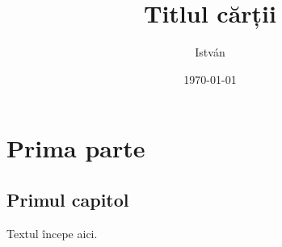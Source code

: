 \documentclass{texign-book}
\title{Titlul cărții}
\subtitle{}
\author{István}
\date{\today}
\begin{document}
\frontmatter
\maketitle
\tableofcontents

\mainmatter
\part{Prima parte}
\chapter{Primul capitol}
Textul începe aici.

\backmatter
\end{document}
